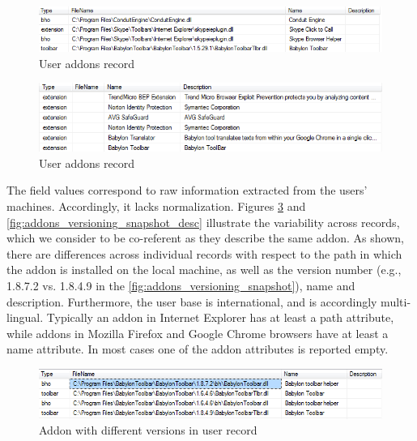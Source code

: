 \documentclass[11pt,oneside]{book}
\begin{document}
\begin{figure}[t]
\centering
\begin{small}
\includegraphics[scale=.8,angle=0]{figures/db_addons_snapshot.png}
\end{small}
\caption{User addons record}
\label{fig:db_addons_snapshot}
\end{figure}

\begin{figure}[t]
\centering
\begin{small}
\includegraphics[scale=.8,angle=0]{figures/db_addons_snapshot_desc.png}
\end{small}
\caption{User addons record}
\label{fig:db_addons_snapshot_desc}
\end{figure}

The field values correspond to raw information extracted from the users' machines. Accordingly, it lacks normalization. Figures \ref{fig:addons_versioning_snapshot} and \ref{fig:addons_versioning_snapshot_desc} illustrate the variability across records, which we consider to be co-referent as they describe the same addon. As shown, there are differences across individual records with respect to the path in which the addon is installed on the local machine, as well as the version number (e.g., 1.8.7.2 vs. 1.8.4.9 in the \autoref{fig:addons_versioning_snapshot}), name and description. Furthermore, the user base is international, and is accordingly multi-lingual.   Typically an addon in Internet Explorer has at least a path attribute, while addons in Mozilla Firefox and Google Chrome browsers have at least a name attribute. In most cases one of the addon attributes is reported empty.

\begin{figure}[t]
\centering
\begin{small}
\includegraphics[scale=.8,angle=0]{figures/addons_versioning_snapshot.png}
\end{small}
\caption{Addon with different versions in user record}
\label{fig:addons_versioning_snapshot}
\end{figure}
\end{document}
